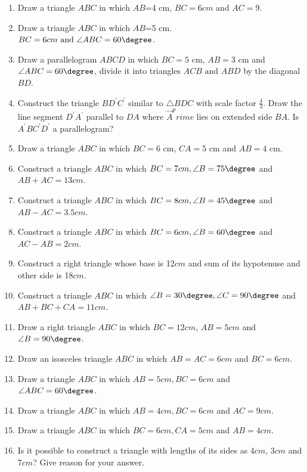 \begin{enumerate}[label=\thesubsection.\arabic*,ref=\thesubsection.\theenumi]
\item Draw a triangle ${ABC}$ in which $AB$=4 cm, $BC=6 cm\text{ and }AC=9$. 
\item Draw a triangle ${ABC}$ in which $AB$=5 cm. $BC=6 cm\text{ and }\angle {ABC}=60\degree$. 
\item Draw a parallelogram ${ABCD}$ in which $BC=5$ cm, $AB=3$ cm and $\angle{ABC}=60\degree$, divide it into triangles ${ACB}\text{ and }{ABD}$ by the diagonal $BD$. 
\item Construct the triangle $BD^\prime C^\prime$ similar to $\triangle{BDC}$ with scale factor $\frac{4}{3}$. Draw the line segment $D^\prime A^\prime $ parallel to $DA$ where $\vec{A}^prime$ lies on extended side $BA$. Is $A^\prime BC^\prime D^\prime $ a parallelogram? 
\item Draw a triangle ${ABC}$ in which $BC=6$ cm, $CA=5$ cm and $AB=4$ cm. 
\item Construct a triangle $ABC$ in which $BC=7cm, \angle{B}=75\degree$ and $AB + AC = 13 cm$.
\label{chapters/9/11/2/1}
	\\
	\solution 

%
\item Construct a triangle $ABC$ in which $BC=8cm, \angle{B}=45\degree$ and $AB - AC = 3.5 cm$.
\label{chapters/9/11/2/2}
\\
\solution

%
\item Construct a triangle $ABC$ in which $BC=6cm, \angle{B}=60\degree$ and $AC - AB = 2cm$.
\label{chapters/9/11/2/3}
\\
\solution 

%
\item Construct a right triangle whose base is 12$cm$ and sum of its hypotenuse and other side is 18$cm$.
\label{chapters/9/11/2/5}
\\
\solution

%
\item Construct a triangle $ABC$ in which $\angle{B}=30\degree, \angle{C}=90\degree$ and  $AB+BC+CA=11cm$.
\label{chapters/9/11/2/4}
\\
\solution 

%
\item Draw a right triangle ${ABC}$ in which $BC=12 cm$, $AB=5 cm$ and $\angle{B}=90\degree$.
\item Draw an isosceles triangle ${ABC}$ in which $AB=AC=6cm$ and $BC =6cm$.
\item Draw a triangle ${ABC}$ in which $AB=5cm,BC=6cm$ and $\angle {ABC}=60\degree$.
\item Draw a triangle ${ABC}$ in which $AB=4cm, BC=6cm$ and $AC=9cm$.
\item Draw a triangle ${ABC}$ in which $BC=6 cm, CA=5 cm$ and $AB=4 cm$. 
\item Is it possible to construct a triangle with lengths of its sides as 4$cm$, 3$cm$ and 7$cm$? Give reason for your answer.


\end{enumerate}
